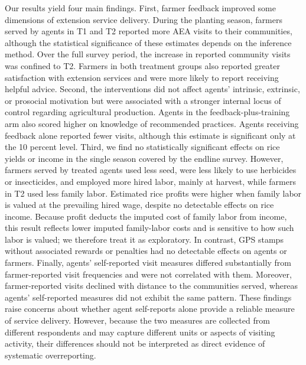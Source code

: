 \documentclass[11pt]{article}
\begin{document}
Our results yield four main findings. First, farmer feedback improved some dimensions of extension service delivery. During the planting season, farmers served by agents in T1 and T2 reported more AEA visits to their communities, although the statistical significance of these estimates depends on the inference method. Over the full survey period, the increase in reported community visits was confined to T2. Farmers in both treatment groups also reported greater satisfaction with extension services and were more likely to report receiving helpful advice. Second, the interventions did not affect agents’ intrinsic, extrinsic, or prosocial motivation but were associated with a stronger internal locus of control regarding agricultural production. Agents in the feedback-plus-training arm also scored higher on knowledge of recommended practices. Agents receiving feedback alone reported fewer visits, although this estimate is significant only at the 10 percent level. Third, we find no statistically significant effects on rice yields or income in the single season covered by the endline survey. However, farmers served by treated agents used less seed, were less likely to use herbicides or insecticides, and employed more hired labor, mainly at harvest, while farmers in T2 used less family labor. Estimated rice profits were higher when family labor is valued at the prevailing hired wage, despite no detectable effects on rice income. Because profit deducts the imputed cost of family labor from income, this result reflects lower imputed family-labor costs and is sensitive to how such labor is valued; we therefore treat it as exploratory. In contrast, GPS stamps without associated rewards or penalties had no detectable effects on agents or farmers. Finally, agents’ self-reported visit measures differed substantially from farmer-reported visit frequencies and were not correlated with them. Moreover, farmer-reported visits declined with distance to the communities served, whereas agents’ self-reported measures did not exhibit the same pattern. These findings raise concerns about whether agent self-reports alone provide a reliable measure of service delivery. However, because the two measures are collected from different respondents and may capture different units or aspects of visiting activity, their differences should not be interpreted as direct evidence of systematic overreporting. 
\end{document}
